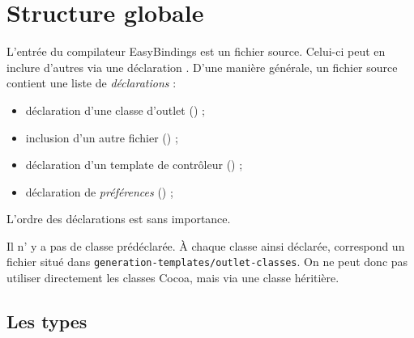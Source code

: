 

\chapter{Structure globale}



L'entrée du compilateur EasyBindings est un fichier source. Celui-ci peut en inclure d'autres via une déclaration . D'une manière générale, un fichier source contient une liste de \emph{déclarations} :
\begin{itemize}
  \item déclaration d'une classe d'outlet () ;
  \item inclusion d'un autre fichier () ;
  \item déclaration d'un template de contrôleur () ;
  \item déclaration de \emph{préférences} () ;
\end{itemize}

L'ordre des déclarations est sans importance.



Il n' y a pas de classe prédéclarée. À chaque classe ainsi déclarée, correspond un fichier situé dans \texttt{generation-templates/outlet-classes}. On ne peut donc pas utiliser directement les classes Cocoa, mais via une classe héritière.





\section{Les types}

